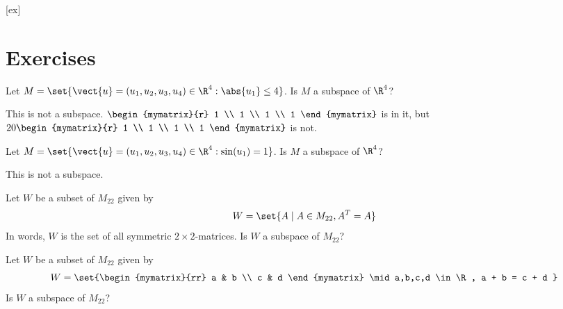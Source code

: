 [ex]
\section*{Exercises}

\begin{enumialphparenastyle}

\begin{ex} Let $M=\set{\vect{u}=(u_{1},u_{2},u_{3},u_{4}) \in 
\R^{4}:\abs{u_{1}} \leq 4}$. Is $M$ a subspace of $\R^4$?
\begin{sol}
This is not a subspace. $\begin{mymatrix}{r}
1 \\
1 \\
1 \\
1
\end{mymatrix} $ is in
it, but $20\begin{mymatrix}{r}
1 \\
1 \\
1 \\
1
\end{mymatrix} $ is not. 
\end{sol}
\end{ex}

\begin{ex} Let $M=\set{\vect{u}=(u_{1},u_{2},u_{3},u_{4}) \in 
\R^{4}:\sin (u_{1}) =1}$. Is $M$ a subspace of $\R^4$?
\begin{sol}
This is not a subspace.
\end{sol}
\end{ex}

\begin{ex} Let $W$ be a subset of $M_{22}$ given by 
\[
W = \set{A \mid A \in M_{22}, A^T = A }  
\]
In words, $W$ is the set of all symmetric $2 \times 2$-matrices. Is $W$ a subspace of $M_{22}$?
\end{ex}

\begin{ex} Let $W$ be a subset of $M_{22}$ given by 
\[
W = \set{\begin{mymatrix}{rr}
a  & b \\
c & d 
\end{mymatrix} \mid a,b,c,d \in \R, a + b = c + d }
\]
Is $W$ a subspace of $M_{22}$?
\end{ex}


\end{enumialphparenastyle}
